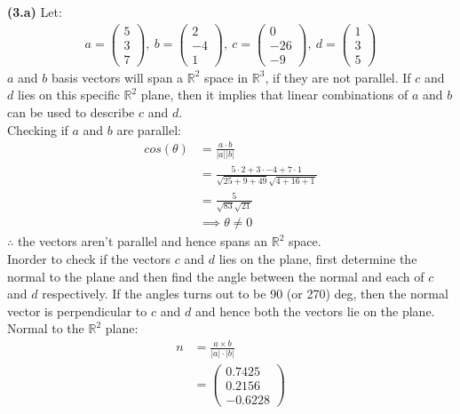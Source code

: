 \documentclass[12pt,letterpaper,fleqn]{article}
\theoremstyle{definition}
\begin{document}
\newpage
\textbf{(3.a)} Let:
\begin{equation*}
\begin{split}
a = \begin{pmatrix}
5\\
3\\
7
\end{pmatrix},~
b = \begin{pmatrix}
2\\
-4\\
1
\end{pmatrix},~
c = \begin{pmatrix}
0\\
-26\\
-9
\end{pmatrix},~
d = \begin{pmatrix}
1\\
3\\
5
\end{pmatrix}
\end{split}
\end{equation*}
$a$ and $b$ basis vectors will span a $\mathbb{R}^{2}$ space in $\mathbb{R}^{3}$, if they are not parallel. If $c$ and $d$ lies on this specific $\mathbb{R}^{2}$ plane, then it implies that linear combinations of $a$ and $b$ can be used to describe $c$ and $d$.\\
Checking if $a$ and $b$ are parallel:
\begin{equation*}
\begin{split}
cos(\theta) &= \frac{a \cdot b}{|a||b|}\\
&= \frac{5 \cdot 2 + 3 \cdot -4 + 7 \cdot 1}{\sqrt{25 + 9 + 49}\sqrt{4 + 16 + 1}}\\
&= \frac{5}{\sqrt{83}\sqrt{21}}\\
&\implies \theta \neq 0
\end{split}
\end{equation*}  
$\therefore$ the vectors aren't parallel and hence spans an $\mathbb{R}^{2}$ space.\\
Inorder to check if the vectors $c$ and $d$ lies on the plane, first determine the normal to the plane and then find the angle between the normal and each of $c$ and $d$ respectively. If the angles turns out to be 90 (or 270) deg, then the normal vector is perpendicular to $c$ and $d$ and hence both the vectors lie on the plane.\\
Normal to the $\mathbb{R}^{2}$ plane:
\begin{equation*}
\begin{split}
n &= \frac{a \times b}{|a|\cdot|b|}\\
 &=  \begin{pmatrix}
0.7425\\
0.2156\\
-0.6228
\end{pmatrix}
\end{split}
\end{equation*}
\end{document}
